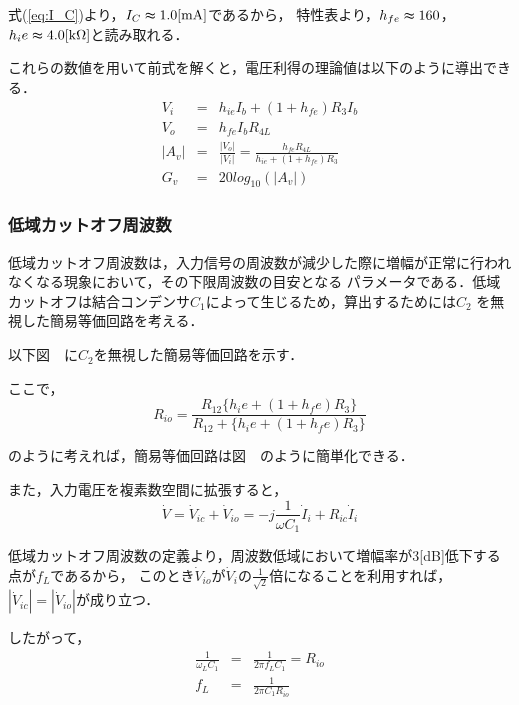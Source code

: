\documentclass[dvipdfmx,titlepage,a4j]{jsarticle}  %
\numberwithin{equation}{section}
\begin{document}
式(\ref{eq:I_C})より，$I_C \thickapprox 1.0 \mathrm{[mA]}$であるから，
特性表より，$h_{fe} \thickapprox 160$，$h_ie \thickapprox 4.0 \mathrm{[k \Omega]}$と読み取れる．

これらの数値を用いて前式を解くと，電圧利得の理論値は以下のように導出できる．
\begin{eqnarray}
  V_i &=& h_{ie} I_b + (1+h_{fe})R_3 I_b \\
  V_o &=& h_{fe} I_b R_{4L} \\
  \left\lvert A_v \right\rvert &=& \frac{\left\lvert V_o \right\rvert}{\left\lvert V_i \right\rvert}
  = \frac{h_{fe} R_{4L}}{h_{ie} + (1+h_{fe})R_3} \\
  G_v &=& 20log_{10}(\left\lvert A_v \right\rvert)
\end{eqnarray}

\subsubsection{低域カットオフ周波数}
低域カットオフ周波数は，入力信号の周波数が減少した際に増幅が正常に行われなくなる現象において，その下限周波数の目安となる
パラメータである．低域カットオフは結合コンデンサ$C_1$によって生じるため，算出するためには$C_2$
を無視した簡易等価回路を考える．

以下図　に$C_2$を無視した簡易等価回路を示す．

ここで，
\begin{equation}
  R_{io} = \frac{R_{12} \{h_ie + ( 1 + h_fe)R_3\}}{R_{12} + \{h_ie + ( 1 + h_fe)R_3\}}
\end{equation}

のように考えれば，簡易等価回路は図　のように簡単化できる．

また，入力電圧を複素数空間に拡張すると，
\begin{equation}
  \dot{V} = \dot{V}_{ic} + \dot{V}_{io} = -j \frac{1}{\omega C_1} \dot{I}_i + R_{ic} \dot{I}_i
\end{equation}

低域カットオフ周波数の定義より，周波数低域において増幅率が3[dB]低下する点が$f_L$であるから，
このとき$\dot{V}_{io}$が$\dot{V}_{i}$の$\frac{1}{\sqrt{2}}$倍になることを利用すれば，
$\left\lvert \dot{V}_{ic} \right\rvert = \left\lvert \dot{V}_{io} \right\rvert$が成り立つ．

したがって，
\begin{eqnarray}
  \frac{1}{\omega_L C_1} &=& \frac{1}{2 \pi f_L C_1} = R_{io} \\
  f_L &=& \frac{1}{2 \pi C_1 R_{io}}
\end{eqnarray}
\end{document}
